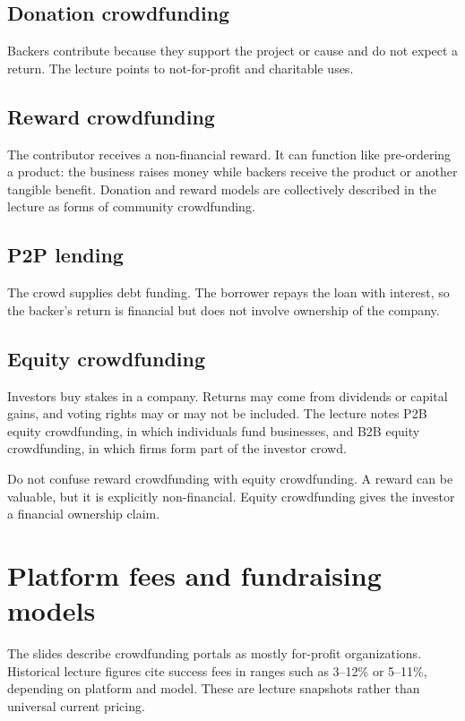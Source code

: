 \subsection{Donation crowdfunding}

Backers contribute because they support the project or cause and do not expect a return. The lecture points to not-for-profit and charitable uses.

\subsection{Reward crowdfunding}

The contributor receives a non-financial reward. It can function like pre-ordering a product: the business raises money while backers receive the product or another tangible benefit. Donation and reward models are collectively described in the lecture as forms of community crowdfunding.

\subsection{P2P lending}

The crowd supplies debt funding. The borrower repays the loan with interest, so the backer's return is financial but does not involve ownership of the company.

\subsection{Equity crowdfunding}

Investors buy stakes in a company. Returns may come from dividends or capital gains, and voting rights may or may not be included. The lecture notes P2B equity crowdfunding, in which individuals fund businesses, and B2B equity crowdfunding, in which firms form part of the investor crowd.

\begin{pitfall}
Do not confuse reward crowdfunding with equity crowdfunding. A reward can be valuable, but it is explicitly non-financial. Equity crowdfunding gives the investor a financial ownership claim.
\end{pitfall}

\section{Platform fees and fundraising models}

The slides describe crowdfunding portals as mostly for-profit organizations. Historical lecture figures cite success fees in ranges such as 3--12\% or 5--11\%, depending on platform and model. These are lecture snapshots rather than universal current pricing.

